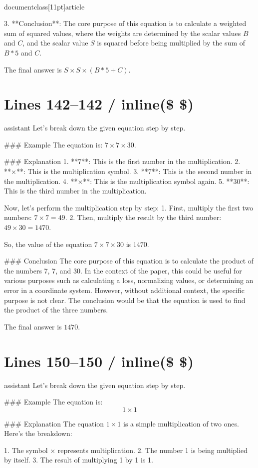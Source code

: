 \\documentclass[11pt]{article}
\begin{document}
3. **Conclusion**: The core purpose of this equation is to calculate a weighted sum of squared values, where the weights are determined by the scalar values \( B \) and \( C \), and the scalar value \( S \) is squared before being multiplied by the sum of \( B*5 \) and \( C \).

The final answer is \(\boxed{S \times S \times (B*5 + C)}\).


\section*{Lines 142–142 / inline(\$ \$) }
assistant
Let's break down the given equation step by step.

### Example
The equation is: \(7 \times 7 \times 30\).

### Explanation
1. **7**: This is the first number in the multiplication.
2. **×**: This is the multiplication symbol.
3. **7**: This is the second number in the multiplication.
4. **×**: This is the multiplication symbol again.
5. **30**: This is the third number in the multiplication.

Now, let's perform the multiplication step by step:
1. First, multiply the first two numbers: \(7 \times 7 = 49\).
2. Then, multiply the result by the third number: \(49 \times 30 = 1470\).

So, the value of the equation \(7 \times 7 \times 30\) is \(1470\).

### Conclusion
The core purpose of this equation is to calculate the product of the numbers 7, 7, and 30. In the context of the paper, this could be useful for various purposes such as calculating a loss, normalizing values, or determining an error in a coordinate system. However, without additional context, the specific purpose is not clear. The conclusion would be that the equation is used to find the product of the three numbers.

The final answer is \(\boxed{1470}\).


\section*{Lines 150–150 / inline(\$ \$) }
assistant
Let's break down the given equation step by step.

### Example
The equation is:
\[ 1 \times 1 \]

### Explanation
The equation \( 1 \times 1 \) is a simple multiplication of two ones. Here's the breakdown:

1. The symbol \(\times\) represents multiplication.
2. The number 1 is being multiplied by itself.
3. The result of multiplying 1 by 1 is 1.
\end{document}
